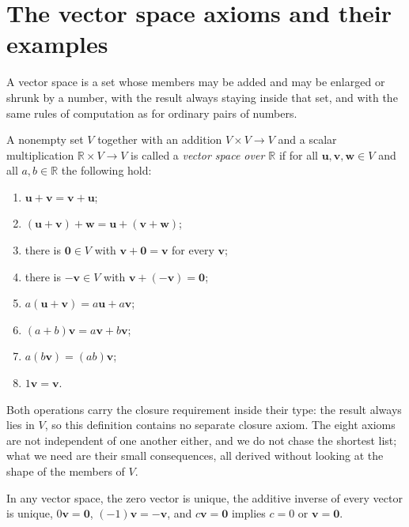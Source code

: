 \section{The vector space axioms and their examples}

A vector space is a set whose members may be added and may be enlarged or shrunk by a number,
with the result always staying inside that set, and with the same rules of computation as for
ordinary pairs of numbers.

\begin{definisi}
A nonempty set $V$ together with an addition $V\times V\to V$ and a scalar multiplication
$\mathbb{R}\times V\to V$ is called a \emph{vector space over $\mathbb{R}$} if for all
$\mathbf{u},\mathbf{v},\mathbf{w}\in V$ and all $a,b\in\mathbb{R}$ the following hold:
\begin{enumerate}
  \item $\mathbf{u}+\mathbf{v}=\mathbf{v}+\mathbf{u}$;
  \item $(\mathbf{u}+\mathbf{v})+\mathbf{w}=\mathbf{u}+(\mathbf{v}+\mathbf{w})$;
  \item there is $\mathbf{0}\in V$ with $\mathbf{v}+\mathbf{0}=\mathbf{v}$ for every
        $\mathbf{v}$;
  \item there is $-\mathbf{v}\in V$ with $\mathbf{v}+(-\mathbf{v})=\mathbf{0}$;
  \item $a(\mathbf{u}+\mathbf{v})=a\mathbf{u}+a\mathbf{v}$;
  \item $(a+b)\mathbf{v}=a\mathbf{v}+b\mathbf{v}$;
  \item $a(b\mathbf{v})=(ab)\mathbf{v}$;
  \item $1\mathbf{v}=\mathbf{v}$.
\end{enumerate}
\end{definisi}

Both operations carry the closure requirement inside their type: the result always lies in $V$,
so this definition contains no separate closure axiom. The eight axioms are not independent of
one another either, and we do not chase the shortest list; what we need are their small
consequences, all derived without looking at the shape of the members of $V$.

\begin{lemma}
In any vector space, the zero vector is unique, the additive inverse of every vector is unique,
$0\mathbf{v}=\mathbf{0}$, $(-1)\mathbf{v}=-\mathbf{v}$, and $c\mathbf{v}=\mathbf{0}$ implies
$c=0$ or $\mathbf{v}=\mathbf{0}$.
\end{lemma}

